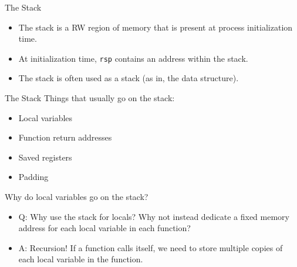 \documentclass[hyphens,aspectratio=169]{beamer}
\begin{document}
\begin{frame}[fragile]{The Stack}
    \begin{itemize}
        \pause \item The stack is a RW region of memory that is present at process initialization time.
        \pause \item At initialization time, \texttt{rsp} contains an address within the stack.
        \pause \item The stack is often used as a stack (as in, the data structure).
    \end{itemize}
\end{frame}

\begin{frame}[fragile]{The Stack}
    Things that usually go on the stack:
    \begin{itemize}
        \pause \item Local variables
        \pause \item Function return addresses
        \pause \item Saved registers
        \pause \item Padding
    \end{itemize}
\end{frame}

\begin{frame}[fragile]{Why do local variables go on the stack?}
    \begin{itemize}
        \pause \item Q: Why use the stack for locals? Why not instead dedicate a fixed memory address for each local variable in each function?
        \pause \item A: Recursion! If a function calls itself, we need to store multiple copies of each local variable in the function.
    \end{itemize}
\end{frame}
\end{document}
